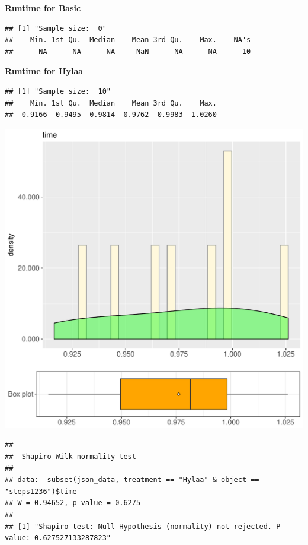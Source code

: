 \documentclass{article}\usepackage[]{graphicx}\usepackage[]{color}
\makeatletter
\def\maxwidth{ %
  \ifdim\Gin@nat@width>\linewidth
    \linewidth
  \else
    \Gin@nat@width
  \fi
}
\newenvironment{kframe}{%
 \def\at@end@of@kframe{}%
 \ifinner\ifhmode%
  \def\at@end@of@kframe{\end{minipage}}%
  \begin{minipage}{\columnwidth}%
 \fi\fi%
 \def\FrameCommand##1{\hskip\@totalleftmargin \hskip-\fboxsep
 \colorbox{shadecolor}{##1}\hskip-\fboxsep
     \hskip-\linewidth \hskip-\@totalleftmargin \hskip\columnwidth}%
 \MakeFramed {\advance\hsize-\width
   \@totalleftmargin\z@ \linewidth\hsize
   \@setminipage}}%
 {\par\unskip\endMakeFramed%
 \at@end@of@kframe}
\newenvironment{knitrout}{}{} %
\makeatother
\begin{document}
 \textbf{Runtime for Basic}
\begin{knitrout}
\color{fgcolor}\begin{kframe}
\begin{verbatim}
## [1] "Sample size:  0"
##    Min. 1st Qu.  Median    Mean 3rd Qu.    Max.    NA's 
##      NA      NA      NA     NaN      NA      NA      10
\end{verbatim}
\end{kframe}
\end{knitrout}
 \textbf{Runtime for Hylaa}
\begin{knitrout}
\color{fgcolor}\begin{kframe}
\begin{verbatim}
## [1] "Sample size:  10"
##    Min. 1st Qu.  Median    Mean 3rd Qu.    Max. 
##  0.9166  0.9495  0.9814  0.9762  0.9983  1.0260
\end{verbatim}
\end{kframe}
\includegraphics[width=\maxwidth]{figure/RH3_Hylaa_steps1236-1} 
\begin{kframe}\begin{verbatim}
## 
## 	Shapiro-Wilk normality test
## 
## data:  subset(json_data, treatment == "Hylaa" & object == "steps1236")$time
## W = 0.94652, p-value = 0.6275
## 
## [1] "Shapiro test: Null Hypothesis (normality) not rejected. P-value: 0.627527133287823"
\end{verbatim}
\end{kframe}
\end{knitrout}
  
\end{document}
